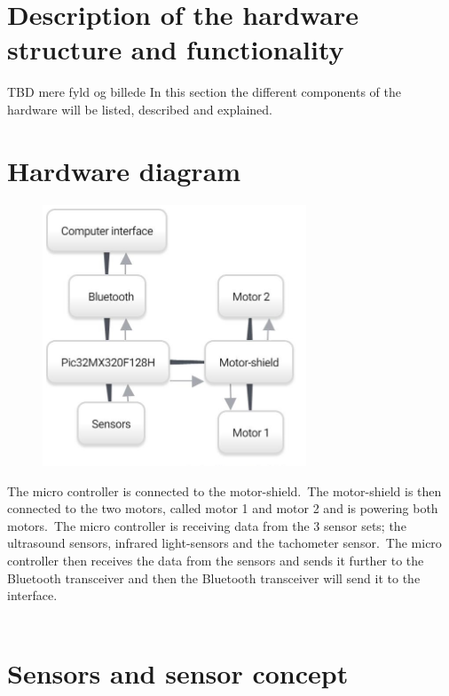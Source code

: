 \section{Description of the hardware structure and functionality}
 
TBD mere fyld og billede
In this section the different components of the hardware will be listed, described and explained.\


\section{Hardware diagram}
\begin{figure}[!ht]
	\centering
	\includegraphics[width=0.7\textwidth]{figures/hardwareDIA.jpg}
	\caption{}
	\label{Hardware diagram}
\end{figure}

The micro controller is connected to the motor-shield.\ The motor-shield is then connected to the two motors, called motor 1 and motor 2 and is powering both motors.\ The micro controller is receiving data from the 3 sensor sets; the ultrasound sensors, infrared light-sensors and the tachometer sensor.\ The micro controller then receives the data from the sensors and sends it further to the Bluetooth transceiver and then the Bluetooth transceiver will send it to the interface. \\ \\

\section{Sensors and sensor concept}

